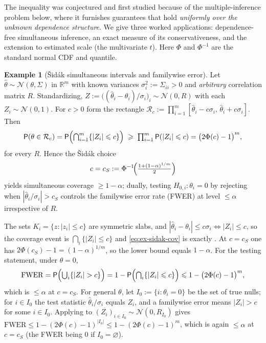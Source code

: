 \documentclass[12pt,a4paper]{article}
\makeatletter
\theoremstyle{definition}
\newtheorem{example}[theorem]{Example}
\renewenvironment{proof}[1][\proofname]{\par
  \pushQED{\qed}%
  \normalfont \topsep6\p@\@plus6\p@\relax
  \trivlist
  \item[\hskip\labelsep\bfseries #1\@addpunct{.}]\ignorespaces
}{%
  \popQED\endtrivlist\@endpefalse
}
\newcommand{\R}{\mathbb{R}}
\newcommand{\PP}{\mathsf{P}}
\newcommand{\caln}{\mathcal{N}}
\makeatother
\begin{document}
The inequality was conjectured and first studied because of the
multiple-inference problem below, where it furnishes guarantees that
hold \emph{uniformly over the unknown dependence structure}.  We give
three worked applications: dependence-free simultaneous inference, an
exact measure of its conservativeness, and the extension to estimated
scale (the multivariate $t$).  Here $\Phi$ and $\Phi^{-1}$ are the
standard normal CDF and quantile.

\begin{example}[\v{S}id\'ak simultaneous intervals and familywise error]
  \label{ex:sidak-ci}
  Let $\hat\theta\sim\caln(\theta,\Sigma)$ in $\R^m$ with known variances
  $\sigma_i^2:=\Sigma_{ii}>0$ and \emph{arbitrary} correlation matrix
  $R$.  Standardizing, $Z:=\bigl((\hat\theta_i-\theta_i)/\sigma_i\bigr)_i
  \sim\caln(0,R)$ with each $Z_i\sim\caln(0,1)$.  For $c>0$ form the
  rectangle $\mathcal R_c:=\prod_{i=1}^m[\hat\theta_i-c\sigma_i,\,
  \hat\theta_i+c\sigma_i]$.  Then
  \begin{equation}\label{eq:ex-sidak-cov}
    \PP(\theta\in\mathcal R_c)
    =\PP\Bigl(\textstyle\bigcap_{i=1}^m\{|Z_i|\leqslant c\}\Bigr)
    \;\geqslant\;\prod_{i=1}^m\PP(|Z_i|\leqslant c)
    =\bigl(2\Phi(c)-1\bigr)^m ,
  \end{equation}
  for every $R$.  Hence the \v{S}id\'ak choice
  \[
    c=c_S:=\Phi^{-1}\!\Bigl(\tfrac{1+(1-\alpha)^{1/m}}{2}\Bigr)
  \]
  yields simultaneous coverage $\geqslant 1-\alpha$; dually, testing
  $H_{0,i}:\theta_i=0$ by rejecting when $|\hat\theta_i/\sigma_i|>c_S$ controls the
  familywise error rate (FWER) at level $\leqslant\alpha$ irrespective of
  $R$.
\end{example}

\begin{proof}
  The sets $K_i=\{z:|z_i|\leqslant c\}$ are symmetric slabs, and
  $|\hat\theta_i-\theta_i|\leqslant c\sigma_i\iff|Z_i|\leqslant c$, so the
  coverage event is $\bigcap_i\{|Z_i|\leqslant c\}$ and
  \eqref{eq:ex-sidak-cov} is exactly .  At $c=c_S$ one
  has $2\Phi(c_S)-1=(1-\alpha)^{1/m}$, so the lower bound equals
  $1-\alpha$.  For the testing statement, under $\theta=0$,
  \[
    \mathrm{FWER}
    =\PP\Bigl(\textstyle\bigcup_i\{|Z_i|>c\}\Bigr)
    =1-\PP\Bigl(\textstyle\bigcap_i\{|Z_i|\leqslant c\}\Bigr)
    \leqslant 1-\bigl(2\Phi(c)-1\bigr)^m ,
  \]
  which is $\leqslant\alpha$ at $c=c_S$.  For general $\theta$, let
  $I_0:=\{i:\theta_i=0\}$ be the set of true nulls; for $i\in I_0$ the
  test statistic $\hat\theta_i/\sigma_i$ equals $Z_i$, and a familywise
  error means $|Z_i|>c$ for some $i\in I_0$.  Applying 
  to $(Z_i)_{i\in I_0}\sim\caln(0,R_{I_0})$ gives
  $\mathrm{FWER}\leqslant 1-(2\Phi(c)-1)^{|I_0|}\leqslant
  1-(2\Phi(c)-1)^m$, which is again $\leqslant\alpha$ at $c=c_S$ (the FWER
  being $0$ if $I_0=\varnothing$).
\end{proof}
\end{document}
